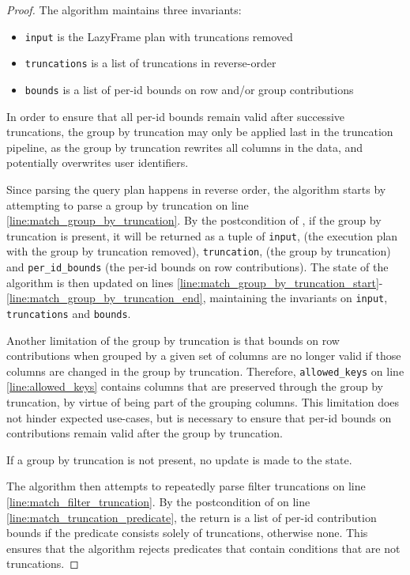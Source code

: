 \documentclass{article}
\begin{document}
\begin{proof}

    The algorithm maintains three invariants:
    \begin{itemize}
        \item \texttt{input} is the LazyFrame plan with truncations removed
        \item \texttt{truncations} is a list of truncations in reverse-order
        \item \texttt{bounds} is a list of per-id bounds on row and/or group contributions
    \end{itemize}

    In order to ensure that all per-id bounds remain valid after successive truncations,
    the group by truncation may only be applied last in the truncation pipeline,
    as the group by truncation rewrites all columns in the data,
    and potentially overwrites user identifiers.

    Since parsing the query plan happens in reverse order,
    the algorithm starts by attempting to parse a group by truncation on line \ref{line:match_group_by_truncation}.
    By the postcondition of ,
    if the group by truncation is present, it will be returned as a tuple of
    \texttt{input}, (the execution plan with the group by truncation removed),
    \texttt{truncation}, (the group by truncation) and 
    \texttt{per\_id\_bounds} (the per-id bounds on row contributions).
    The state of the algorithm is then updated on lines \ref{line:match_group_by_truncation_start}-\ref{line:match_group_by_truncation_end},
    maintaining the invariants on \texttt{input}, \texttt{truncations} and \texttt{bounds}.

    Another limitation of the group by truncation is that bounds on row contributions when grouped by a given set of columns
    are no longer valid if those columns are changed in the group by truncation.
    Therefore, \texttt{allowed\_keys} on line \ref{line:allowed_keys} contains columns that are preserved through the group by truncation,
    by virtue of being part of the grouping columns.
    This limitation does not hinder expected use-cases, but is necessary to ensure that per-id bounds on contributions remain valid after the group by truncation.

    If a group by truncation is not present, no update is made to the state.
    
    The algorithm then attempts to repeatedly parse filter truncations on line \ref{line:match_filter_truncation}.
    By the postcondition of  on line \ref{line:match_truncation_predicate},
    the return is a list of per-id contribution bounds if the predicate consists solely of truncations, 
    otherwise none.
    This ensures that the algorithm rejects predicates that contain conditions that are not truncations.


\end{proof}
\end{document}
